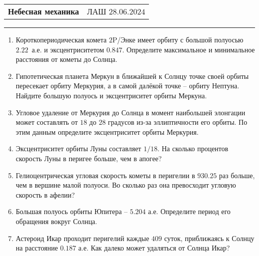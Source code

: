 \documentclass[12pt]{article}
\begin{document}
\begin{tabularx}{\textwidth}{Xr}
{\Large \textbf{Небесная механика}} & ЛАШ $28.06.2024$ \\
\end{tabularx}
\noindent\rule{\textwidth}{0.4pt}
\begin{enumerate}
    \section*{Базовые задачи}
    \subsection*{Геометрия эллипса}
    \item{Короткопериодическая комета $2$P/Энке имеет орбиту с большой полуосью $2.22$~а.е. и эксцентриситетом $0.847$. Определите максимальное и минимальное расстояния от кометы до Солнца.}
	\item{Гипотетическая планета Меркун в ближайшей к Солнцу точке своей орбиты пересекает орбиту Меркурия, а в самой далёкой точке -- орбиту Нептуна. Найдите большую полуось и эксцентриситет орбиты Меркуна.}
	\item{Угловое удаление от Меркурия до Солнца в момент наибольшей элонгации может составлять от $18$ до $28$ градусов из-за эллиптичности его орбиты. По этим данным определите эксцентриситет орбиты Меркурия.}
	\item{Эксцентриситет орбиты Луны составляет $1/18$. На сколько процентов скорость Луны в перигее больше, чем в апогее?}
	\item{Гелиоцентрическая угловая скорость кометы в перигелии в $930.25$ раз больше, чем в вершине малой полуоси. Во сколько раз она превосходит угловую скорость в афелии?}
	\item{Большая полуось орбиты Юпитера -- $5.204$ а.е. Определите период его обращения вокруг Солнца.}
	\item{Астероид Икар проходит перигелий каждые $409$ суток, приближаясь к Солнцу на расстояние $0.187$ а.е. Как далеко может удаляться от Солнца Икар?}

\end{enumerate}
\end{document}
